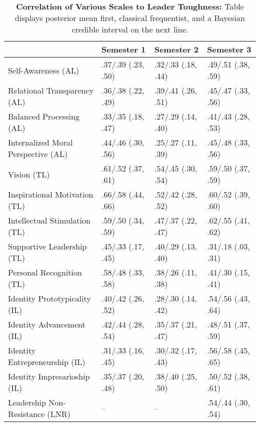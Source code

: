 \begin{table}[ht]
\centering
\begin{tabular}{llll}
  \hline
 & Semester 1 & Semester 2 & Semester 3 \\ 
  \hline
Self-Awareness (AL) & .37/.39 (.23, .50) & .32/.33 (.18, .44) & .49/.51 (.38, .59) \\ 
  Relational Transparency (AL) & .36/.38 (.22, .49) & .39/.41 (.26, .51) & .45/.47 (.33, .56) \\ 
  Balanced Processing (AL) & .33/.35 (.18, .47) & .27/.29 (.14, .40) & .41/.43 (.28, .53) \\ 
  Internalized Moral Perspective (AL) & .44/.46 (.30, .56) & .25/.27 (.11, .39) & .45/.48 (.33, .56) \\ 
  Vision (TL) & .61/.52 (.37, .61) & .54/.45 (.30, .54) & .59/.50 (.37, .59) \\ 
  Inspirational Motivation (TL) & .66/.58 (.44, .66) & .52/.42 (.28, .52) & .60/.52 (.39, .60) \\ 
  Intellectual Stimulation (TL) & .59/.50 (.34, .59) & .47/.37 (.22, .47) & .62/.55 (.41, .62) \\ 
  Supportive Leadership (TL) & .45/.33 (.17, .45) & .40/.29 (.13, .40) & .31/.18 (.03, .31) \\ 
  Personal Recognition (TL) & .58/.48 (.33, .58) & .38/.26 (.11, .38) & .41/.30 (.15, .41) \\ 
  Identity Prototypicality (IL) & .40/.42 (.26, .52) & .28/.30 (.14, .42) & .54/.56 (.43, .64) \\ 
  Identity Advancement (IL) & .42/.44 (.28, .54) & .35/.37 (.21, .47) & .48/.51 (.37, .59) \\ 
  Identity Entrepreneurship (IL) & .31/.33 (.16, .45) & .30/.32 (.17, .43) & .56/.58 (.45, .65) \\ 
  Identity Impresarioship (IL) & .35/.37 (.20, .48) & .38/.40 (.25, .50) & .50/.52 (.38, .61) \\ 
  Leadership Non-Resistance (LNR) & -- & -- & .54/.44 (.30, .54) \\ 
   \hline
\end{tabular}
\caption{\textbf{Correlation of Various Scales to Leader Toughness:} Table displays posterior mean first, classical frequentist, and a Bayesian credible interval on the next line.} 
\label{tab:lead_corr}
\end{table}
